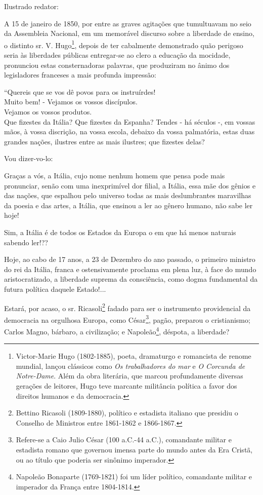\asterisc{}

Ilustrado redator:

A 15 de janeiro de 1850, por entre as graves agitações que tumultuavam
no seio da Assembleia Nacional, em um memorável discurso sobre a
liberdade de ensino, o distinto sr. V. Hugo\footnote{Victor-Marie Hugo
  (1802-1885), poeta, dramaturgo e romancista de renome mundial, lançou
  clássicos como \emph{Os trabalhadores do mar} e \emph{O Corcunda de
  Notre-Dame}. Além da obra literária, que marcou profundamente diversas
  gerações de leitores, Hugo teve marcante militância política a favor
  dos direitos humanos e da democracia.}, depois de ter cabalmente
demonstrado quão perigoso seria às liberdades públicas entregar-se ao
clero a educação da mocidade, pronunciou estas consternadoras palavras,
que produziram no ânimo dos legisladores franceses a mais profunda
impressão:

``Quereis que se vos dê povos para os instruírdes!\\
Muito bem! - Vejamos os vossos discípulos.\\
Vejamos os vossos produtos.\\
Que fizestes da Itália? Que fizestes da Espanha? Tendes - há séculos -,
em vossas mãos, à vossa discrição, na vossa escola, debaixo da vossa
palmatória, estas duas grandes nações, ilustres entre as mais ilustres;
que fizestes delas?

Vou dizer-vo-lo:

Graças a vós, a Itália, cujo nome nenhum homem que pensa pode mais
pronunciar, senão com uma inexprimível dor filial, a Itália, essa mãe
dos gênios e das nações, que espalhou pelo universo todas as mais
deslumbrantes maravilhas da poesia e das artes, a Itália, que ensinou a
ler ao gênero humano, não sabe ler hoje!

Sim, a Itália é de todos os Estados da Europa o em que há menos naturais
sabendo ler!??

Hoje, ao cabo de 17 anos, a 23 de Dezembro do ano passado, o primeiro
ministro do rei da Itália, franca e ostensivamente proclama em plena
luz, à face do mundo aristocratizado, a liberdade suprema da
consciência, como dogma fundamental da futura política daquele
Estado!...

Estará, por acaso, o sr. Ricasoli\footnote{Bettino Ricasoli
  (1809-1880), político e estadista italiano que presidiu o Conselho de
  Ministros entre 1861-1862 e 1866-1867.} fadado para ser o instrumento
providencial da democracia na orgulhosa Europa, como César\footnote{
  Refere-se a Caio Julio César (100 a.C.-44 a.C.), comandante militar e
  estadista romano que governou imensa parte do mundo antes da Era
  Cristã, ou ao título que poderia ser sinônimo imperador.}, pagão,
preparou o cristianismo; Carlos Magno, bárbaro, a civilização; e
Napoleão\footnote{Napoleão Bonaparte (1769-1821) foi um líder
  político, comandante militar e imperador da França entre 1804-1814.},
déspota, a liberdade?

